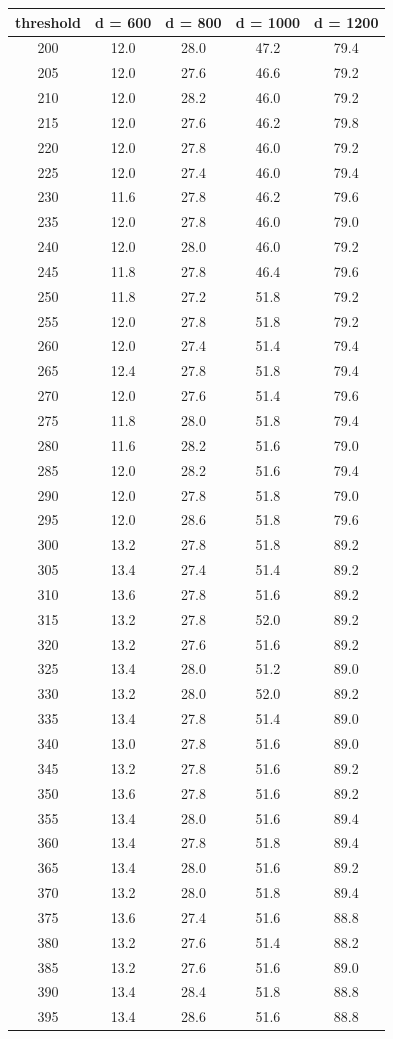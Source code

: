 \documentclass[12pt]{article}
\begin{document}
\begin{table}[h]
\centering
{\setlength{\tabcolsep}{15pt}
\begin{longtable}{c|c|c|c|c}
threshold & d = 600 & d = 800 & d = 1000 & d = 1200 \\\hline
200 & 12.0 & 28.0 & 47.2 & 79.4\\
205 & 12.0 & 27.6 & 46.6 & 79.2\\
210 & 12.0 & 28.2 & 46.0 & 79.2\\
215 & 12.0 & 27.6 & 46.2 & 79.8\\
220 & 12.0 & 27.8 & 46.0 & 79.2\\
225 & 12.0 & 27.4 & 46.0 & 79.4\\
230 & 11.6 & 27.8 & 46.2 & 79.6\\
235 & 12.0 & 27.8 & 46.0 & 79.0\\
240 & 12.0 & 28.0 & 46.0 & 79.2\\
245 & 11.8 & 27.8 & 46.4 & 79.6\\
250 & 11.8 & 27.2 & 51.8 & 79.2\\
255 & 12.0 & 27.8 & 51.8 & 79.2\\
260 & 12.0 & 27.4 & 51.4 & 79.4\\
265 & 12.4 & 27.8 & 51.8 & 79.4\\
270 & 12.0 & 27.6 & 51.4 & 79.6\\
275 & 11.8 & 28.0 & 51.8 & 79.4\\
280 & 11.6 & 28.2 & 51.6 & 79.0\\
285 & 12.0 & 28.2 & 51.6 & 79.4\\
290 & 12.0 & 27.8 & 51.8 & 79.0\\
295 & 12.0 & 28.6 & 51.8 & 79.6\\
300 & 13.2 & 27.8 & 51.8 & 89.2\\
305 & 13.4 & 27.4 & 51.4 & 89.2\\
310 & 13.6 & 27.8 & 51.6 & 89.2\\
315 & 13.2 & 27.8 & 52.0 & 89.2\\
320 & 13.2 & 27.6 & 51.6 & 89.2\\
325 & 13.4 & 28.0 & 51.2 & 89.0\\
330 & 13.2 & 28.0 & 52.0 & 89.2\\
335 & 13.4 & 27.8 & 51.4 & 89.0\\
340 & 13.0 & 27.8 & 51.6 & 89.0\\
345 & 13.2 & 27.8 & 51.6 & 89.2\\
350 & 13.6 & 27.8 & 51.6 & 89.2\\
355 & 13.4 & 28.0 & 51.6 & 89.4\\
360 & 13.4 & 27.8 & 51.8 & 89.4\\
365 & 13.4 & 28.0 & 51.6 & 89.2\\
370 & 13.2 & 28.0 & 51.8 & 89.4\\
375 & 13.6 & 27.4 & 51.6 & 88.8\\
380 & 13.2 & 27.6 & 51.4 & 88.2\\
385 & 13.2 & 27.6 & 51.6 & 89.0\\
390 & 13.4 & 28.4 & 51.8 & 88.8\\
395 & 13.4 & 28.6 & 51.6 & 88.8\\
\end{longtable}}
\end{table}
\end{document}
